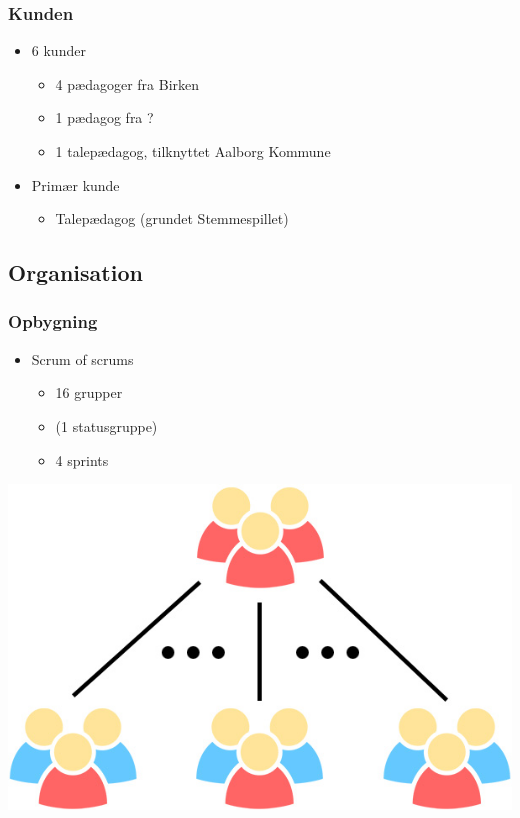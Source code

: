 \begin{frame}
\frametitle{Kunden}

\begin{itemize}
\item 6 kunder
\begin{itemize}
\item 4 pædagoger fra Birken
\item 1 pædagog fra ?
\item 1 talepædagog, tilknyttet Aalborg Kommune
\end{itemize}
\item Primær kunde
\begin{itemize}
\item Talepædagog (grundet Stemmespillet)
\end{itemize}
\end{itemize}

\end{frame}

\subsection{Organisation}

\begin{frame}
\frametitle{Opbygning}

\begin{itemize}
\item Scrum of scrums
\begin{itemize}
\item 16 grupper
\item (1 statusgruppe)
\item 4 sprints
\end{itemize}
\end{itemize}

\centering\includegraphics[height=.5\textheight]{pgraphics/scrum-of-scrums}

\end{frame}

